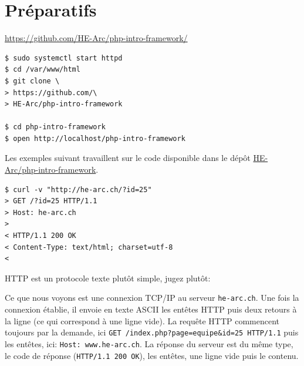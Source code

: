 \hypertarget{pruxe9paratifs}{%
\section{Préparatifs}\label{pruxe9paratifs}}

\href{https://github.com/HE-Arc/php-intro-framework}{https://github.com/HE-Arc/php-intro-framework/}

\begin{english}

\begin{verbatim}
$ sudo systemctl start httpd
$ cd /var/www/html
$ git clone \
> https://github.com/\
> HE-Arc/php-intro-framework

$ cd php-intro-framework
$ open http://localhost/php-intro-framework
\end{verbatim}

\end{english}

Les exemples suivant travaillent sur le code disponible dans le dépôt
\href{https://github.com/HE-Arc/php-intro-framework}{HE-Arc/php-intro-framework}.

\begin{english}

\begin{verbatim}
$ curl -v "http://he-arc.ch/?id=25"
> GET /?id=25 HTTP/1.1
> Host: he-arc.ch
>
< HTTP/1.1 200 OK
< Content-Type: text/html; charset=utf-8
<
\end{verbatim}

\end{english}

\begin{english}

\begin{Shaded}
\begin{Highlighting}[]
\DataTypeTok{\textgreater{}}
\KeywordTok{\textless{}p\textgreater{}}\NormalTok{Hello}
\end{Highlighting}
\end{Shaded}

\end{english}

HTTP est un protocole texte plutôt simple, jugez plutôt:

Ce que nous voyons est une connexion TCP/IP au serveur
\textenglish{\texttt{he-arc.ch}}. Une fois la connexion établie, il
envoie en texte ASCII les entêtes HTTP puis deux retours à la ligne (ce
qui correspond à une ligne vide). La requête HTTP commencent toujours
par la demande, ici
\textenglish{\texttt{GET\ /index.php?page=equipe\&id=25\ HTTP/1.1}} puis
les entêtes, ici: \textenglish{\texttt{Host:\ www.he-arc.ch}}. La
réponse du serveur est du même type, le code de réponse
(\textenglish{\texttt{HTTP/1.1\ 200\ OK}}), les entêtes, une ligne vide
puis le contenu.

